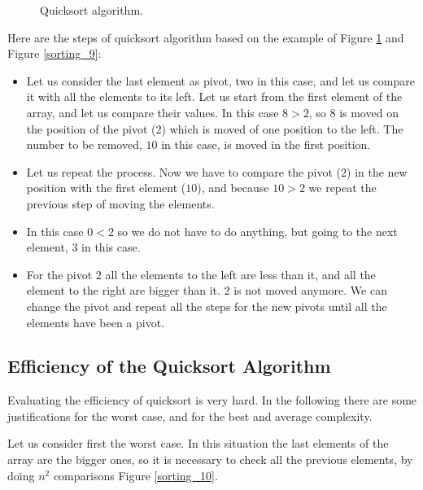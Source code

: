 \begin{figure}[H]

\caption[Quicksort algorithm.]{Quicksort algorithm.}
\label{sorting_8}
\end{figure}

Here are the steps of quicksort algorithm based on the example of Figure \ref{sorting_8} and Figure \ref{sorting_9}:
\begin{itemize}
\item[1] Let us consider the last element as pivot, two in this case, and let us compare it with all the elements to its left. Let us start from the first element of the array, and let us compare their values. In this case \(8 > 2\), so \(8\) is moved on the position of the pivot (\(2\)) which is moved of one position to the left. The number to be removed, \(10\) in this case, is moved in the first position.
\item[2] Let us repeat the process. Now we have to compare the pivot (\(2\)) in the new position with the first element (\(10\)), and because \(10>2\) we repeat the previous step of moving the elements.
\item[3] In this case \(0<2\) so we do not have to do anything, but going to the next element, \(3\) in this case.
\item[4] For the pivot \(2\) all the elements to the left are less than it, and all the element to the right are bigger than it. \(2\) is not moved anymore. We can change the pivot and repeat all the steps for the new pivots until all the elements have been a pivot.
\end{itemize}

\subsection{Efficiency of the Quicksort Algorithm}
Evaluating the efficiency of quicksort is very hard. In the following there are some justifications for the worst case, and for the best and average complexity.

Let us consider first the worst case. In this situation the last elements of the array are the bigger ones, so it is necessary to check all the previous elements, by doing \(n^{2}\) comparisons Figure \ref{sorting_10}.

